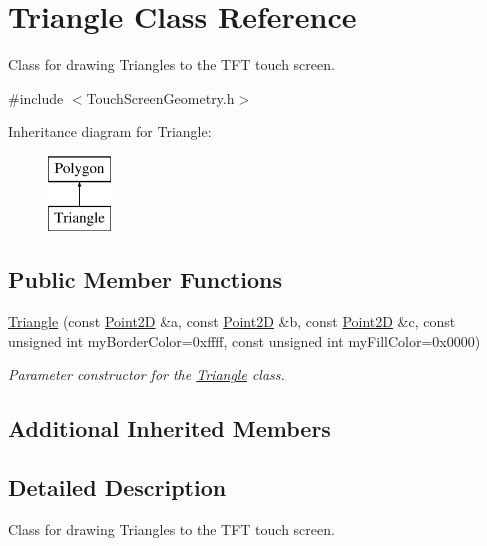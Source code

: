 \hypertarget{class_triangle}{\section{Triangle Class Reference}
\label{class_triangle}
}


Class for drawing Triangles to the T\+F\+T touch screen.  




{\ttfamily \#include $<$Touch\+Screen\+Geometry.\+h$>$}

Inheritance diagram for Triangle\+:\begin{figure}[H]
\begin{center}
\leavevmode
\includegraphics[height=2.000000cm]{class_triangle}
\end{center}
\end{figure}
\subsection*{Public Member Functions}
\begin{DoxyCompactItemize}
\item 
\hyperlink{class_triangle_a477c11aa9dfce48a502e535874474fec}{Triangle} (const \hyperlink{class_point2_d}{Point2\+D} \&a, const \hyperlink{class_point2_d}{Point2\+D} \&b, const \hyperlink{class_point2_d}{Point2\+D} \&c, const unsigned int my\+Border\+Color=0xffff, const unsigned int my\+Fill\+Color=0x0000)
\begin{DoxyCompactList}\small\item\em Parameter constructor for the \hyperlink{class_triangle}{Triangle} class. \end{DoxyCompactList}\end{DoxyCompactItemize}
\subsection*{Additional Inherited Members}


\subsection{Detailed Description}
Class for drawing Triangles to the T\+F\+T touch screen. 

